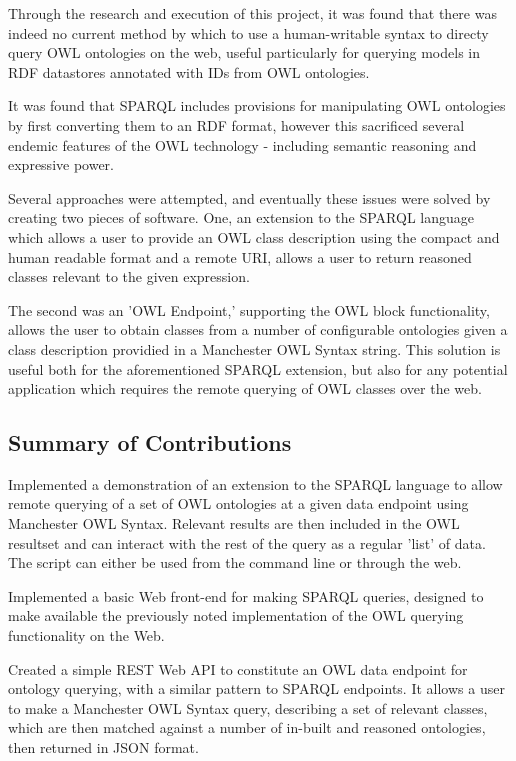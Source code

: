 \documentclass{article}
\begin{document}
Through the research and execution of this project, it was found that there was
indeed no current method by which to use a human-writable syntax to directy query OWL
ontologies on the web, useful particularly for querying models in RDF datastores
annotated with IDs from OWL ontologies.

It was found that SPARQL includes provisions for manipulating OWL ontologies by
first converting them to an RDF format, however this sacrificed several endemic
features of the OWL technology - including semantic reasoning and expressive
power.

Several approaches were attempted, and eventually these issues were solved by
creating two pieces of software. One, an extension to the SPARQL language which
allows a user to provide an OWL class description using the compact and human
readable format and a remote URI, allows a user to return reasoned classes
relevant to the given expression.

The second was an 'OWL Endpoint,' supporting the OWL block functionality, allows
the user to obtain classes from a number of configurable ontologies given a
class description providied in a Manchester OWL Syntax string. This solution is
useful both for the aforementioned SPARQL extension, but also for any potential
application which requires the remote querying of OWL classes over the web.

\subsection{Summary of Contributions}

Implemented a demonstration of an extension to the SPARQL language to allow
remote querying of a set of OWL ontologies at
a given data endpoint using Manchester OWL Syntax. Relevant results are then
included in the OWL resultset and can
interact with the rest of the query as a regular 'list' of data. The script can
either be used from the command line or
through the web.

Implemented a basic Web front-end for making SPARQL queries, designed to make
available the previously noted implementation of
the OWL querying functionality on the Web.

Created a simple REST Web API to constitute an OWL data endpoint for ontology
querying, with a similar pattern to SPARQL
endpoints. It allows a user to make a Manchester OWL Syntax query, describing a
set of relevant classes, which are then
matched against a number of in-built and reasoned ontologies, then returned in
JSON format.
\end{document}
